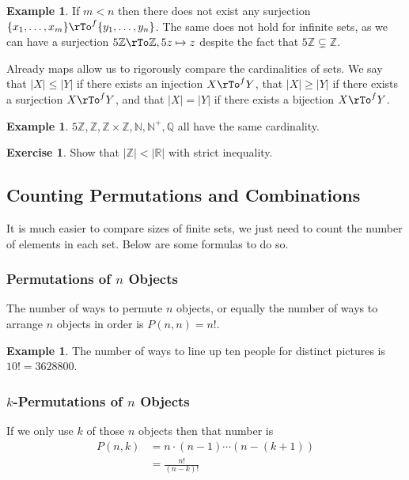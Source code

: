 \documentclass[12pt]{amsart}
\theoremstyle{definition}
\newtheorem{example}[theorem]{Example}
\newtheorem{exercise}[theorem]{Exercise}
\begin{document}
\begin{example} If $m < n$ then there does not exist any surjection $\{x_1, \dots ,x_m\} \rTo^f \{y_1, \dots ,y_n\}$. The same does not hold for infinite sets, as we can have a surjection $5\mathbb{Z} \rTo \mathbb{Z}, 5z \mapsto z$ despite the fact that $5\mathbb{Z} \subsetneq \mathbb{Z}$.
\end{example}

Already maps allow us to rigorously compare the cardinalities of sets. We say that $|X| \leq |Y|$ if there exists an injection $X \rTo^f Y$, that $|X| \geq |Y|$ if there exists a surjection $X \rTo^f Y$, and that $|X| = |Y|$ if there exists a bijection $X \rTo^f Y$.

\begin{example} $5\mathbb{Z}, \mathbb{Z}, \mathbb{Z} \times \mathbb{Z}, \mathbb{N}, \mathbb{N}^+, \mathbb{Q}$ all have the same cardinality.
\end{example}

\begin{exercise} Show that $|\mathbb{Z}| < |\mathbb{R}|$ with strict inequality.
\end{exercise}

\subsection{Counting Permutations and Combinations} It is much easier to compare sizes of finite sets, we just need to count the number of elements in each set. Below are some formulas to do so.

\subsubsection{Permutations of $n$ Objects} The number of ways to permute $n$ objects, or equally the number of ways to arrange $n$ objects in order is $P(n, n) = n!$.

\begin{example} The number of ways to line up ten people for distinct pictures is $10! = 3628800$.
\end{example}

\subsubsection{$k$-Permutations of $n$ Objects} If we only use $k$ of those $n$ objects then that number is
\begin{align*}
P(n, k) & = n \cdot (n-1) \cdots (n-(k+1)) \\
 & = \frac{n!}{(n-k)!}
\end{align*}
\end{document}

